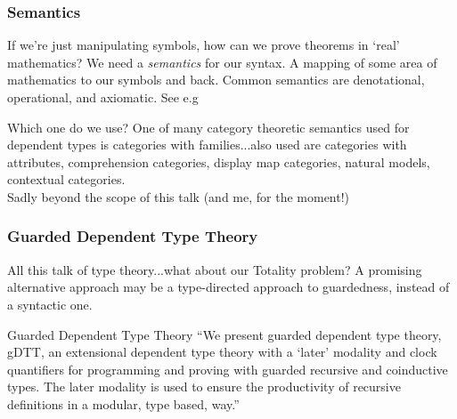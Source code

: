 \documentclass
  [hyperref={colorlinks = true,linkcolor = blue, 
             citecolor = blue, urlcolor = blue}
  ]{beamer}
\begin{document}
\begin{frame}[fragile]
  \frametitle{Semantics}
  \begin{block}{If we're just manipulating symbols, how can we
  prove theorems in `real' mathematics?}
  We need a \textit{semantics} for our syntax. A mapping of some
  area of mathematics to our symbols and back. Common semantics
  are denotational, operational, and axiomatic. See e.g 
  \citep{winskel1993formal}
  \end{block}
  \begin{block}{Which one do we use?}
  One of many category theoretic semantics used for dependent
  types is categories with families...also used are categories 
  with attributes, comprehension
  categories, display map categories, natural models, contextual
  categories. \\ Sadly beyond the scope of this talk (and me, for
  the moment!)
  \end{block}
\end{frame}

\begin{frame}[fragile]
  \frametitle{Guarded Dependent Type Theory}
  \begin{block}{All this talk of type theory...what about our
  Totality problem?}
  A promising alternative approach may be a type-directed
  approach to guardedness, instead of a syntactic one.
  \end{block}

  \begin{block}{Guarded Dependent Type 
    Theory \citep{bizjak2016guarded}}
  ``We present guarded dependent type theory, gDTT, an 
    extensional dependent type theory with a ‘later’ modality 
    and clock quantiﬁers for programming and proving with guarded
    recursive and coinductive types. The later modality is 
    used to ensure the productivity of recursive deﬁnitions in 
    a modular, type based, way.''
  \end{block}


\end{frame}
\end{document}

